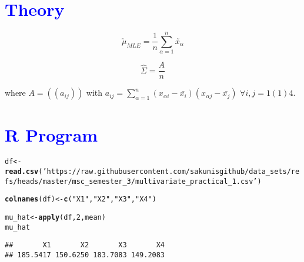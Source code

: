 \documentclass[11pt, a4paper]{article}\usepackage[]{graphicx}\usepackage[]{xcolor}
\makeatletter
\newcommand{\hlnum}[1]{\textcolor[rgb]{0.686,0.059,0.569}{#1}}%
\newcommand{\hlsng}[1]{\textcolor[rgb]{0.192,0.494,0.8}{#1}}%
\newcommand{\hldef}[1]{\textcolor[rgb]{0.345,0.345,0.345}{#1}}%
\newcommand{\hlkwb}[1]{\textcolor[rgb]{0.69,0.353,0.396}{#1}}%
\newcommand{\hlkwd}[1]{\textcolor[rgb]{0.737,0.353,0.396}{\textbf{#1}}}%
\newenvironment{kframe}{%
 \def\at@end@of@kframe{}%
 \ifinner\ifhmode%
  \def\at@end@of@kframe{\end{minipage}}%
  \begin{minipage}{\columnwidth}%
 \fi\fi%
 \def\FrameCommand##1{\hskip\@totalleftmargin \hskip-\fboxsep
 \colorbox{shadecolor}{##1}\hskip-\fboxsep
     \hskip-\linewidth \hskip-\@totalleftmargin \hskip\columnwidth}%
 \MakeFramed {\advance\hsize-\width
   \@totalleftmargin\z@ \linewidth\hsize
   \@setminipage}}%
 {\par\unskip\endMakeFramed%
 \at@end@of@kframe}
\newenvironment{knitrout}{}{} %
\makeatother
\begin{document}
\newpage

\section*{\faArrowAltCircleRight[regular] \textcolor{blue}{Theory}}

$$\utilde{\mu}_{MLE} = \dfrac{1}{n} \sum \limits_{\alpha = 1}^{n} \utilde{x_{\alpha}}$$

$$\hat{\Sigma} = \dfrac{A}{n}$$

where $A = ((a_{ij}))$ with $a_{ij} = \sum \limits_{\alpha = 1}^{n} (x_{\alpha i} - \bar{x_i})(x_{\alpha j} - \bar{x_j}) \,\, \forall i, j = 1(1)4$. 

\section*{\faArrowAltCircleRight[regular] \textcolor{blue}{R Program}}

\begin{knitrout}\tiny
{}\color{fgcolor}\begin{kframe}
\begin{alltt}
\hldef{df} \hlkwb{<-} \hlkwd{read.csv}\hldef{(}\hlsng{'https://raw.githubusercontent.com/sakunisgithub/data_sets/refs/heads/master/msc_semester_3/multivariate_practical_1.csv'}\hldef{)}
\end{alltt}
\end{kframe}
\end{knitrout}

\begin{knitrout}
\color{fgcolor}\begin{kframe}
\begin{alltt}
\hlkwd{colnames}\hldef{(df)} \hlkwb{<-} \hlkwd{c}\hldef{(}\hlsng{"X1"}\hldef{,} \hlsng{"X2"}\hldef{,} \hlsng{"X3"}\hldef{,} \hlsng{"X4"}\hldef{)}
\end{alltt}
\end{kframe}
\end{knitrout}

\begin{knitrout}
\color{fgcolor}\begin{kframe}
\begin{alltt}
\hldef{mu_hat} \hlkwb{<-} \hlkwd{apply}\hldef{(df,} \hlnum{2}\hldef{, mean)}
\hldef{mu_hat}
\end{alltt}
\begin{verbatim}
##       X1       X2       X3       X4 
## 185.5417 150.6250 183.7083 149.2083
\end{verbatim}
\end{kframe}
\end{knitrout}
\end{document}
